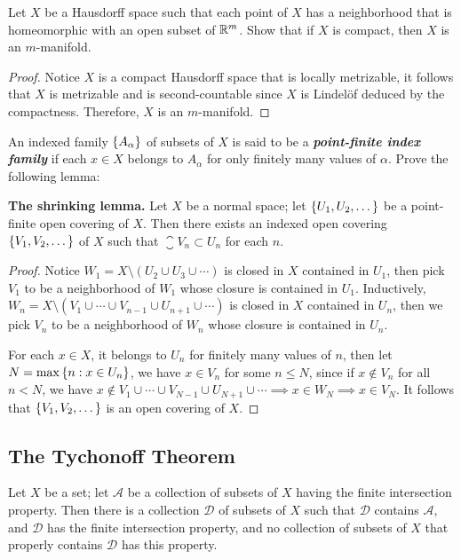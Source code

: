 \documentclass[12pt,a4paper]{article}
\begin{document}
    \begin{ex}
        Let $X$ be a Hausdorff space such that each point of $X$ has a neighborhood that is homeomorphic with an open subset of $\mathbb{R}^m$. Show that if $X$ is compact, then $X$ is an $m$-manifold.
    \end{ex}
    \begin{proof}
        Notice $X$ is a compact Hausdorff space that is locally metrizable, it follows that $X$ is metrizable and is second-countable since $X$ is Lindel\"of deduced by the compactness. Therefore, $X$ is an $m$-manifold. 
    \end{proof}
    \hfill

    \begin{ex}
        An indexed family $\left\{A_\alpha\right\}$ of subsets of $X$ is said to be a \textbf{\textit{point-finite index family}} if each $x\in X$ belongs to $A_\alpha$ for only finitely many values of $\alpha$. Prove the following lemma:
        
        \textbf{{The shrinking lemma.}} Let $X$ be a normal space; let $\left\{U_1,U_2,\dots\right\}$ be a point-finite open covering of $X$. Then there exists an indexed open covering $\left\{V_1,V_2,\dots\right\}$ of $X$ such that $\closure{V_n}\subset U_n$ for each $n$.
    \end{ex}
    \begin{proof}
        Notice $W_1=X\setminus(U_2\cup U_3\cup\cdots)$ is closed in $X$ contained in $U_1$, then pick $V_1$ to be a neighborhood of $W_1$ whose closure is contained in $U_1$. Inductively, $W_n=X\setminus(V_1\cup\cdots\cup V_{n-1}\cup U_{n+1}\cup\cdots)$ is closed in $X$ contained in $U_n$, then we pick $V_n$ to be a neighborhood of $W_n$ whose closure is contained in $U_n$.
        
        For each $x\in X$, it belongs to $U_n$ for finitely many values of $n$, then let $N=\max\left\{n:x\in U_n\right\}$, we have $x\in V_n$ for some $n\leq N$, since if $x\notin V_n$ for all $n<N$, we have $x\notin V_1\cup\cdots\cup V_{N-1}\cup U_{N+1}\cup\cdots\implies x\in W_N\implies x\in V_N$. It follows that $\left\{V_1,V_2,\dots\right\}$ is an open covering of $X$.
    \end{proof}
    \hfill

    \subsection{The Tychonoff Theorem}
    \begin{lemma}
        Let $X$ be a set; let $\mathcal{A}$ be a collection of subsets of $X$ having the finite intersection property. Then there is a collection $\mathcal{D}$ of subsets of $X$ such that $\mathcal{D}$ contains $\mathcal{A}$, and $\mathcal{D}$ has the finite intersection property, and no collection of subsets of $X$ that properly contains $\mathcal{D}$ has this property.
    \end{lemma}
    \hfill
\end{document}
